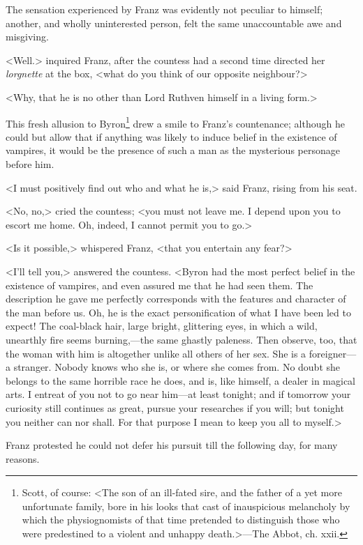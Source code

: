  The sensation experienced by Franz was evidently not peculiar to himself; another, and wholly uninterested person, felt the same unaccountable awe and misgiving. 

 <Well.> inquired Franz, after the countess had a second time directed her \textit{lorgnette} at the box, <what do you think of our opposite neighbour?>

<Why, that he is no other than Lord Ruthven himself in a living form.> 

 This fresh allusion to Byron\footnote{Scott, of course: <The son of an ill-fated sire, and the father of a yet more unfortunate family, bore in his looks that cast of inauspicious melancholy by which the physiognomists of that time pretended to distinguish those who were predestined to a violent and unhappy death.>—The Abbot, ch. xxii.} drew a smile to Franz's countenance; although he could but allow that if anything was likely to induce belief in the existence of vampires, it would be the presence of such a man as the mysterious personage before him. 

 <I must positively find out who and what he is,> said Franz, rising from his seat. 

 <No, no,> cried the countess; <you must not leave me. I depend upon you to escort me home. Oh, indeed, I cannot permit you to go.> 

 <Is it possible,> whispered Franz, <that you entertain any fear?> 

 <I'll tell you,> answered the countess. <Byron had the most perfect belief in the existence of vampires, and even assured me that he had seen them. The description he gave me perfectly corresponds with the features and character of the man before us. Oh, he is the exact personification of what I have been led to expect! The coal-black hair, large bright, glittering eyes, in which a wild, unearthly fire seems burning,—the same ghastly paleness. Then observe, too, that the woman with him is altogether unlike all others of her sex. She is a foreigner—a stranger. Nobody knows who she is, or where she comes from. No doubt she belongs to the same horrible race he does, and is, like himself, a dealer in magical arts. I entreat of you not to go near him—at least tonight; and if tomorrow your curiosity still continues as great, pursue your researches if you will; but tonight you neither can nor shall. For that purpose I mean to keep you all to myself.> 

 Franz protested he could not defer his pursuit till the following day, for many reasons. 

